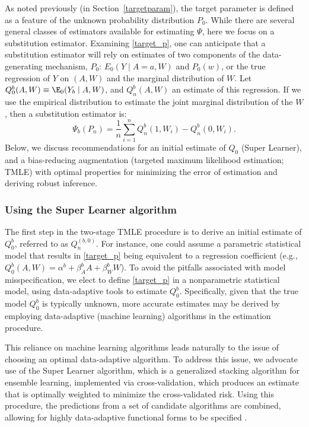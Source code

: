 As noted previously (in Section~\ref{targetparam}), the target parameter is
defined as a feature of the unknown probability distribution $P_{0}$. While
there are several general classes of estimators available for estimating
$\Psi$, here we focus on a substitution estimator. Examining \ref{target_p},
one can anticipate that a substitution estimator will rely on estimates of
two components of the data-generating mechanism, $P_0$: $E_0 (Y \mid A=a, W)$
and $P_0(w)$, or the true regression of $Y$ on $(A,W)$ and the marginal
distribution of $W$. Let $Q^{b}_{0}(A, W) \equiv \E_{0}(Y_{b} \mid A, W)$, and
$Q^{b}_{n}(A,W)$ an estimate of this regression. If we use the empirical
distribution to estimate the joint marginal distribution of the $W$, then a
substitution estimator is:
\begin{equation}
\label{subest}
\Psi_b(P_{n}) = \frac{1}{n}\sum_{i = 1}^{n} Q^{b}_{n}(1, W_{i}) -
Q^{b}_{n}(0, W_{i}).
\end{equation}
Below, we discuss recommendations for an initial estimate of $Q_0$ (Super
Learner), and a bias-reducing augmentation (targeted maximum likelihood
estimation; TMLE) with optimal properties for minimizing the error of
estimation and deriving robust inference.

\subsubsection{Using the Super Learner algorithm}\label{superlearner}

The first step in the two-stage TMLE procedure is to derive an initial estimate
of $Q^{b}_{0}$, referred to as $Q^{(b, 0)}_{n}$. For instance, one could assume
a parametric statistical model that results in \ref{target_p} being equivalent
to a regression coefficient (e.g., $Q^{b}_{0}(A, W) = \alpha^{b} +
\beta^{b}_{A}A + \beta^{b}_{W}W$). To avoid the pitfalls associated with model
misspecification, we elect to define \ref{target_p} in a nonparametric
statistical model, using data-adaptive tools to estimate $Q^{b}_{0}$.
Specifically, given that the true model $Q^{b}_{0}$ is typically unknown, more
accurate estimates may be derived by employing data-adaptive (machine learning)
algorithms in the estimation procedure.

This reliance on machine learning algorithms leads naturally to the issue of
choosing an optimal data-adaptive algorithm. To address this issue, we advocate
use of the Super Learner algorithm, which is a generalized stacking algorithm
for ensemble learning, implemented via cross-validation, which produces an
estimate that is optimally weighted to minimize the cross-validated risk. Using
this procedure, the predictions from a set of candidate algorithms are
combined, allowing for highly data-adaptive functional forms to be
specified \cite{van2007super}.

